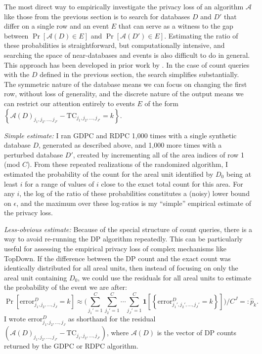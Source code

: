 \documentclass{article}
\begin{document}
The most direct way to empirically investigate the privacy loss of an algorithm $\mathcal{A}$ like those from the previous section is to search for databases $D$ and $D'$ that differ on a single row and an event $E$ that can serve as a witness to the gap between $\Pr[\mathcal{A}(D) \in E]$ and $\Pr[\mathcal{A}(D') \in E]$.  Estimating the ratio of these probabilities is straightforward, but computationally intensive, and searching the space of near-databases and events is also difficult to do in general.  This approach has been developed in prior work by \citet{TK}.  In the case of count queries with the $D$ defined in the previous section, the search simplifies substantially.  The symmetric nature of the database means we can focus on changing the first row, without loss of generality, and the discrete nature of the output means we can restrict our attention entirely to events $E$ of the form $\left\{\mathcal{A}(D)_{j_1, j_2, \ldots, j_{J'}}
- \mathrm{TC}_{j_1, j_2, \ldots, j_{J'}}
= k\right\}$.

\emph{Simple estimate:} I ran GDPC and RDPC 1,000 times with a single synthetic database $D$, generated as described above, and 1,000 more times with a perturbed database $D'$, created by incrementing all of the area indices of row 1 (mod $C$). From these repeated realizations of the randomized algorithm, I estimated the probability of the count for the areal unit identified by $D_0$ being at least $i$ for a range of values of $i$ close to the exact total count for this area.  For any $i$, the log of the ratio of these probabilities constitutes a (noisy) lower bound on $\epsilon$, and the maximum over these log-ratios is my ``simple'' empirical estimate of the privacy loss.

\emph{Less-obvious estimate:} Because of the special structure of count queries, there is a way to avoid re-running the DP algorithm repeatedly.  This can be particularly useful for assessing the empirical privacy loss of complex mechanisms like TopDown. If the difference between the DP count and the exact count was identically distributed for all areal units, then instead of focusing on only the areal unit containing $D_0$, we could use the residuals for all areal units to estimate the probability of the event we are after:
$$\Pr\left[\mathrm{error}_{j_1, j_2, \ldots, j_{J}}^D
= k\right]
\approx
\bigg(\sum_{j_1'=1}^C\sum_{j_2'=1}^C\cdots\sum_{j_J' = 1}^C \mathbf{1}\left[\left\{\mathrm{error}_{j_1', j_2', \ldots, j_{J}'}^D
= k\right\}\right]\bigg)\bigg/C^J =: \hat{p}_k.
$$
I wrote $\mathrm{error}_{j_1, j_2, \ldots, j_{J}}^D$ as shorthand for the residual $\left(\mathcal{A}(D)_{j_1, j_2, \ldots, j_{J'}}
- \mathrm{TC}_{j_1, j_2, \ldots, j_{J'}}\right)$, where $\mathcal{A}(D)$ is the vector of DP counts returned by the GDPC or RDPC algorithm.
\end{document}
